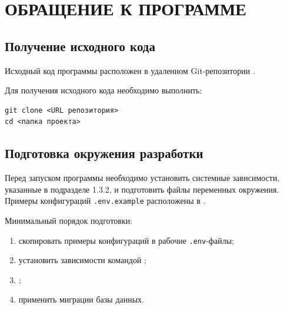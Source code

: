 \documentclass[12pt,a4paper]{extarticle}
\begin{document}
\section{ОБРАЩЕНИЕ К ПРОГРАММЕ}

\subsection{Получение исходного кода}

\begin{hseExample}
Исходный код программы расположен в удаленном Git-репозитории .

Для получения исходного кода необходимо выполнить:

\begin{verbatim}
git clone <URL репозитория>
cd <папка проекта>
\end{verbatim}
\end{hseExample}

\subsection{Подготовка окружения разработки}

\begin{hseExample}
Перед запуском программы необходимо установить системные зависимости, указанные в подразделе 1.3.2, и подготовить файлы переменных окружения. Примеры конфигураций \texttt{.env.example} расположены в .

Минимальный порядок подготовки:

\begin{enumerate}[label=\arabic*), leftmargin=1.25cm]
    \item скопировать примеры конфигураций в рабочие \texttt{.env}-файлы;
    \item установить зависимости командой ;
    \item {};
    \item применить миграции базы данных.
\end{enumerate}
\end{hseExample}
\end{document}
